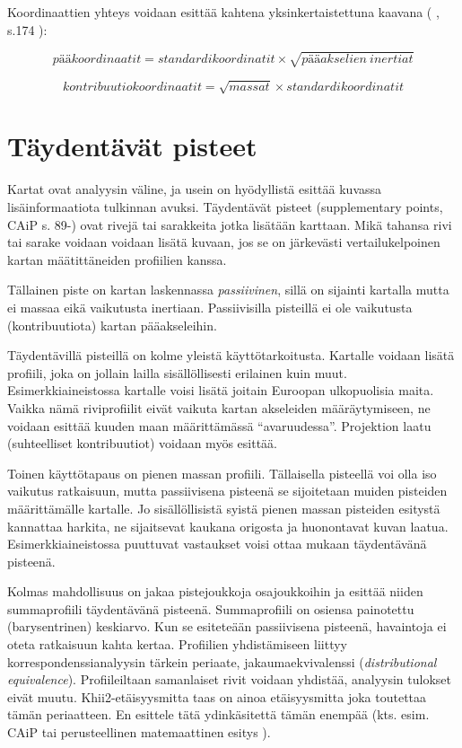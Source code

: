 \documentclass[
  finnish,
]{book}
\begin{document}
Koordinaattien yhteys voidaan esittää kahtena yksinkertaistettuna kaavana
( \citet{RefWorks:doc:5b8175eee4b08da192f99a35}, s.174 ):

\begin{equation}
  pääkoordinaatit = standardikoordinatit \times \sqrt{pääakselien \: inertiat}
    \label{eq:pcfromstd1}
\end{equation}

\begin{equation}
  kontribuutiokoordinaatit = \sqrt{massat} \times  standardikoordinatit 
    \label{eq:kontribfromstd1}
\end{equation}

\hypertarget{tuxe4ydentuxe4vuxe4t-pisteet}{%
\chapter{Täydentävät pisteet}\label{tuxe4ydentuxe4vuxe4t-pisteet}}

Kartat ovat analyysin väline, ja usein on hyödyllistä esittää kuvassa
lisäinformaatiota tulkinnan avuksi. Täydentävät pisteet (supplementary points,
CAiP s. 89-) ovat rivejä tai sarakkeita jotka lisätään karttaan. Mikä tahansa
rivi tai sarake voidaan voidaan lisätä kuvaan, jos se on järkevästi vertailukelpoinen
kartan määtittäneiden profiilien kanssa.

Tällainen piste on kartan laskennassa \emph{passiivinen}, sillä on sijainti kartalla
mutta ei massaa eikä vaikutusta inertiaan. Passiivisilla pisteillä ei ole vaikutusta
(kontribuutiota) kartan pääakseleihin.

Täydentävillä pisteillä on kolme yleistä käyttötarkoitusta. Kartalle voidaan lisätä
profiili, joka on jollain lailla sisällöllisesti erilainen kuin muut. Esimerkkiaineistossa
kartalle voisi lisätä joitain Euroopan ulkopuolisia maita. Vaikka nämä riviprofiilit
eivät vaikuta kartan akseleiden määräytymiseen, ne voidaan esittää kuuden maan
määrittämässä ``avaruudessa''. Projektion laatu (suhteelliset kontribuutiot) voidaan myös
esittää.

Toinen käyttötapaus on pienen massan profiili. Tällaisella pisteellä voi olla iso
vaikutus ratkaisuun, mutta passiivisena pisteenä se sijoitetaan muiden pisteiden
määrittämälle kartalle. Jo sisällöllisistä syistä pienen massan pisteiden esitystä
kannattaa harkita, ne sijaitsevat kaukana origosta ja huonontavat kuvan laatua.
Esimerkkiaineistossa puuttuvat vastaukset voisi ottaa mukaan täydentävänä pisteenä.

Kolmas mahdollisuus on jakaa pistejoukkoja osajoukkoihin ja esittää niiden
summaprofiili täydentävänä pisteenä. Summaprofiili on osiensa painotettu
(barysentrinen) keskiarvo. Kun se esiteteään passiivisena pisteenä, havaintoja ei
oteta ratkaisuun kahta kertaa. Profiilien yhdistämiseen liittyy
korrespondenssianalyysin tärkein periaate, jakaumaekvivalenssi (\emph{distributional
equivalence}). Profiileiltaan samanlaiset rivit voidaan yhdistää, analyysin tulokset
eivät muutu. Khii2-etäisyysmitta taas on ainoa etäisyysmitta joka toutettaa tämän
periaatteen. En esittele tätä ydinkäsitettä tämän enempää (kts. esim. CAiP tai
perusteellinen matemaattinen esitys \citep{RefWorks:doc:5a857a43e4b0ed2d44664d75}).
\end{document}
